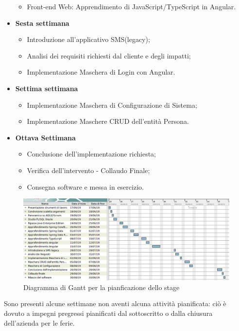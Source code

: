 \begin{itemize}
		\begin{itemize}
			\item Front-end Web: Apprendimento di JavaScript/TypeScript in Angular.
		\end{itemize}
	\item \textbf{Sesta settimana}
		\begin{itemize}
			\item Introduzione all’applicativo SMS(legacy);
			\item Analisi dei requisiti richiesti dal cliente e degli impatti;
			\item Implementazione Maschera di Login con Angular.
		\end{itemize}	
	\item \textbf{Settima settimana}
		\begin{itemize}
			\item Implementazione Maschera di Configurazione di Sistema;
			\item Implementazione Maschere CRUD dell’entità Persona.
		\end{itemize}	
	\item \textbf{Ottava Settimana}
		\begin{itemize}
			\item Conclusione dell’implementazione richiesta;
			\item Verifica dell’intervento - Collaudo Finale;
			\item Consegna software e messa in esercizio.
		\end{itemize}	
\end{itemize}


\begin{figure}[!h] 
	\centering 
	\includegraphics[width=1\columnwidth]{immagini/stage/gantt} 
	\caption{Diagramma di Gantt per la pianficazione dello stage}
	\label{figura:gantt-1}
\end{figure}

Sono presenti alcune settimane non aventi alcuna attività pianificata: ciò è dovuto a impegni pregressi pianificati dal sottoscritto o dalla chiusura dell'azienda per le ferie.